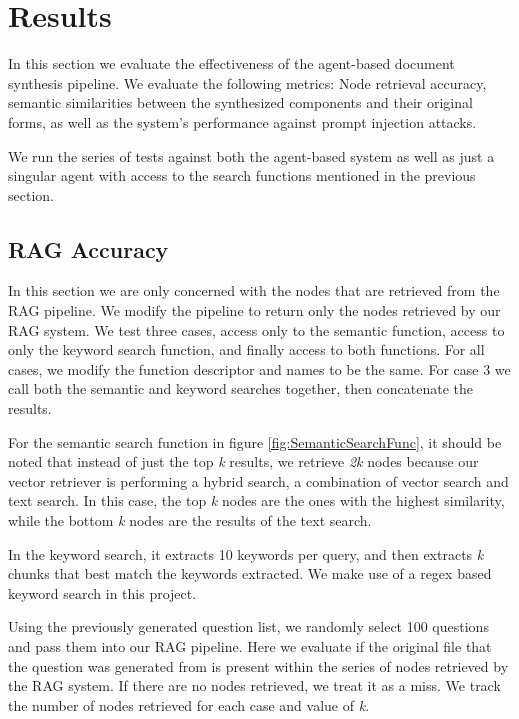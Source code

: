 \chapter{Results} \label{results}

In this section we evaluate the effectiveness of the agent-based document synthesis pipeline. We evaluate the following metrics: Node retrieval accuracy, semantic similarities between the synthesized components and their original forms, as well as the system's performance against prompt injection attacks.

We run the series of tests against both the agent-based system as well as just a singular agent with access to the search functions mentioned in the previous section.
\section{RAG Accuracy}
In this section we are only concerned with the nodes that are retrieved from the RAG pipeline. We modify the pipeline to return only the nodes retrieved by our RAG system. We test three cases, access only to the semantic function, access to only the keyword search function, and finally access to both functions. For all cases, we modify the function descriptor and names to be the same. For case 3 we call both the semantic and keyword searches together, then concatenate the results.

For the semantic search function in figure \ref{fig:SemanticSearchFunc}, it should be noted that instead of just the top \textit{k} results, we retrieve \textit{2k} nodes because our vector retriever is performing a hybrid search, a combination of vector search and text search. In this case, the top \textit{k} nodes are the ones with the highest similarity, while the bottom \textit{k} nodes are the results of the text search.

In the keyword search, it extracts 10 keywords per query, and then extracts \textit{k} chunks that best match the keywords extracted. We make use of a regex based keyword search in this project.

Using the previously generated question list, we randomly select 100 questions and pass them into our RAG pipeline. Here we evaluate if the original file that the question was generated from is present within the series of nodes retrieved by the RAG system. If there are no nodes retrieved, we treat it as a miss. We track the number of nodes retrieved for each case and value of \textit{k}.

